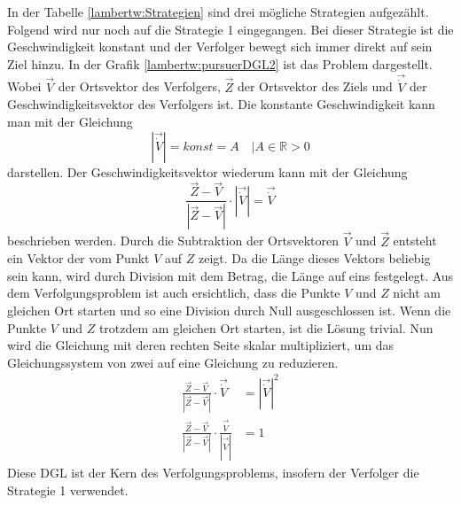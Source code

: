 In der Tabelle \eqref{lambertw:Strategien} sind drei mögliche Strategien aufgezählt.
Folgend wird nur noch auf die Strategie 1 eingegangen.
Bei dieser Strategie ist die Geschwindigkeit konstant und der Verfolger bewegt sich immer direkt auf sein Ziel hinzu.
In der Grafik \eqref{lambertw:pursuerDGL2} ist das Problem dargestellt.
Wobei $\overrightarrow{V}$ der Ortsvektor des Verfolgers, $\overrightarrow{Z}$ der Ortsvektor des Ziels und $\overrightarrow{\dot{V}}$ der Geschwindigkeitsvektor des Verfolgers ist.
Die konstante Geschwindigkeit kann man mit der Gleichung
\begin{equation}
    |\overrightarrow{\dot{V}}|
    = konst = A
    \quad|A\in\mathbb{R}>0
\end{equation}
darstellen. Der Geschwindigkeitsvektor wiederum kann mit der Gleichung
\begin{equation}
    \frac{\overrightarrow{Z}-\overrightarrow{V}}{|\overrightarrow{Z}-\overrightarrow{V}|}\cdot|\overrightarrow{\dot{V}}|
    =
    \overrightarrow{\dot{V}}
\end{equation}
beschrieben werden.
Durch die Subtraktion der Ortsvektoren $\overrightarrow{V}$ und $\overrightarrow{Z}$ entsteht ein Vektor der vom Punkt $V$ auf $Z$ zeigt.
Da die Länge dieses Vektors beliebig sein kann, wird durch Division mit dem Betrag, die Länge auf eins festgelegt.
Aus dem Verfolgungsproblem ist auch ersichtlich, dass die Punkte $V$ und $Z$ nicht am gleichen Ort starten und so eine Division durch Null ausgeschlossen ist.
Wenn die Punkte $V$ und $Z$ trotzdem am gleichen Ort starten, ist die Lösung trivial.
Nun wird die Gleichung mit deren rechten Seite skalar multipliziert, um das Gleichungssystem von zwei auf eine Gleichung zu reduzieren.
\begin{align}
    \label{lambertw:pursuerDGL}
    \frac{\overrightarrow{Z}-\overrightarrow{V}}{|\overrightarrow{Z}-\overrightarrow{V}|}\cdot
    \overrightarrow{\dot{V}}
    &=
    |\overrightarrow{\dot{V}}|^2
    \\
    \frac{\overrightarrow{Z}-\overrightarrow{V}}{|\overrightarrow{Z}-\overrightarrow{V}|}\cdot \frac{\overrightarrow{\dot{V}}}{|\overrightarrow{\dot{V}}|}
    &=
    1
\end{align}
Diese DGL ist der Kern des Verfolgungsproblems, insofern der Verfolger die Strategie 1 verwendet.


